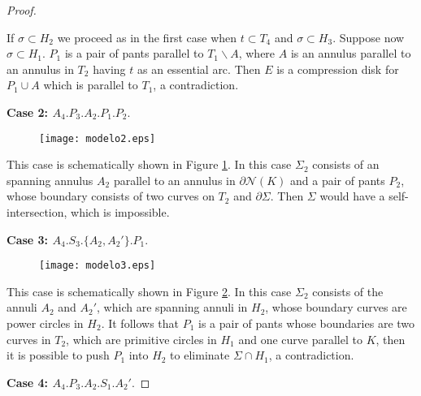 \documentclass[12pt]{amsart}
\begin{document}
\begin{proof}
\begin{itemize}
If $\sigma\subset H_2$ we proceed as in the first case when $t\subset T_4$ and $\sigma\subset H_3$.
Suppose now $\sigma\subset H_1$. $P_1$ is a pair of pants parallel to $T_1\backslash A$, where $A$ is an annulus parallel to an annulus in $T_2$ having $t$ as an essential arc. Then $E$ is a compression disk for $P_1\cup A$ which is parallel to $T_1$, a contradiction. 
\end{itemize}


{\bf{Case 2: $A_4.P_3.A_2.P_1.P_2$}}. 

\begin{figure}
\begin{center}
\texttt{[image: modelo2.eps]}
\end{center}
\caption{}
\label{case2}
\end{figure}

This case is schematically shown in Figure \ref{case2}. In this case $\Sigma_2$ consists of an spanning annulus $A_2$ parallel to an annulus in $\partial \mathcal{N}(K)$ and a pair of pants $P_2$, whose boundary consists of two curves on $T_2$ and $\partial \Sigma$. Then $\Sigma$ would have a self-intersection, which is impossible.

\vspace{1cm}

{\bf{Case 3: $A_4.S_3.\{A_2,A_2'\}.P_1$}}.

\begin{figure}
\begin{center}
\texttt{[image: modelo3.eps]}
\end{center}
\caption{}
\label{case3}
\end{figure}

This case is schematically shown in Figure \ref{case3}. In this case $\Sigma_2$ consists of the annuli $A_2$ and $A_2'$, which are spanning annuli in $H_2$, whose boundary curves are power circles in $H_2$. It follows that $P_1$ is a pair of pants whose boundaries are two curves in $T_2$, which are primitive circles in $H_1$ and one curve parallel to $K$, then it is possible to push $P_1$ into $H_2$ to eliminate $\Sigma\cap H_1$, a contradiction. %

\vspace{1cm}

{\bf{Case 4: $A_4.P_3.A_2.S_1.A_2'$}}. 


\end{proof}
\end{document}
